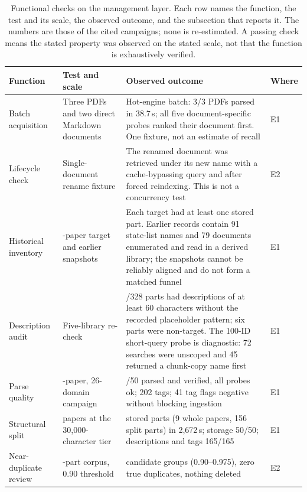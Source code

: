 \documentclass[final,5p,times,twocolumn]{elsarticle}
\begin{document}
\begin{table}[t]
\centering
\footnotesize
\setlength{\tabcolsep}{4pt}
\caption{Functional checks on the management layer. Each row names the
function, the test and its scale, the observed outcome, and the subsection
that reports it. The numbers are those of the cited campaigns; none is
re-estimated. A passing check means the stated property was observed on the
stated scale, not that the function is exhaustively verified.}
\label{tab:kb-checks}
\begin{tabular}{@{}>{\raggedright\arraybackslash}p{}>{\raggedright\arraybackslash}p{}>{\raggedright\arraybackslash}p{}>{\raggedright\arraybackslash}p{}@{}}
\toprule
Function & Test and scale & Observed outcome & Where\\
\midrule
Batch acquisition & Three PDFs and two direct Markdown documents & Hot-engine batch: 3/3 PDFs parsed in 38.7\,s; all five document-specific probes ranked their document first. One fixture, not an estimate of recall & E1\\
Lifecycle check & Single-document rename fixture & The renamed document was retrieved under its new name with a cache-bypassing query and after forced reindexing. This is not a concurrency test & E2\\
Historical inventory & 100-paper target and earlier snapshots & Each target had at least one stored part. Earlier records contain 91 state-list names and 79 documents enumerated and read in a derived library; the snapshots cannot be reliably aligned and do not form a matched funnel & E1\\
Description audit & Five-library re-check & 328/328 parts had descriptions of at least 60 characters without the recorded placeholder pattern; six parts were non-target. The 100-ID short-query probe is diagnostic: 72 searches were unscoped and 45 returned a chunk-copy name first & E1\\
Parse quality & 50-paper, 26-domain campaign & 50/50 parsed and verified, all probes ok; 202 tags; 41 tag flags negative without blocking ingestion & E1\\
Structural split & 50 papers at the 30{,}000-character tier & 165 stored parts (9 whole papers, 156 split parts) in 2{,}672\,s; storage 50/50; descriptions and tags 165/165 & E1\\
Near-duplicate review & 322-part corpus, 0.90 threshold & 35 candidate groups (0.90--0.975), zero true duplicates, nothing deleted & E2\\

\end{tabular}
\end{table}
\end{document}
